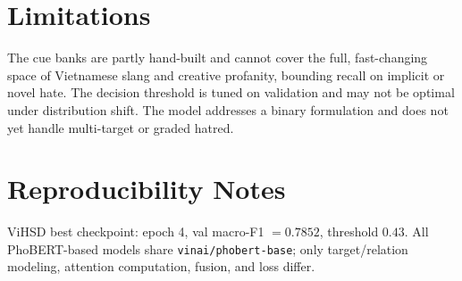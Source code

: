 \documentclass[11pt]{article}
\begin{document}
\section*{Limitations}
The cue banks are partly hand-built and cannot cover the full, fast-changing space of Vietnamese slang and creative profanity, bounding recall on implicit or novel hate. The decision threshold is tuned on validation and may not be optimal under distribution shift. The model addresses a binary formulation and does not yet handle multi-target or graded hatred.




\appendix
\section{Reproducibility Notes}
\label{sec:appendix}
ViHSD best checkpoint: epoch 4, val macro-F1 $=0.7852$, threshold $0.43$. All PhoBERT-based models share \texttt{vinai/phobert-base}; only target/relation modeling, attention computation, fusion, and loss differ.
\end{document}
